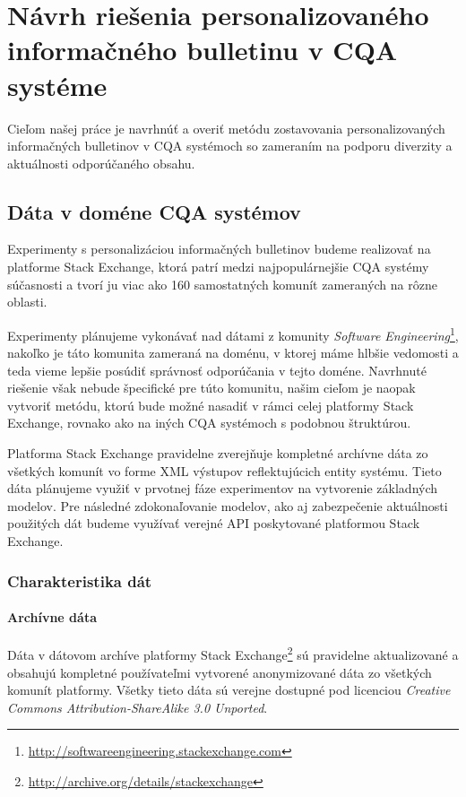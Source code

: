 \newpage
\chapter{Návrh riešenia personalizovaného informačného bulletinu v CQA systéme}

Cieľom našej práce je navrhnúť a overiť metódu zostavovania personalizovaných informačných bulletinov v CQA systémoch
so zameraním na podporu diverzity a aktuálnosti odporúčaného obsahu.

\section{Dáta v doméne CQA systémov}

Experimenty s personalizáciou informačných bulletinov budeme realizovať na platforme Stack Exchange, ktorá patrí medzi
najpopulárnejšie CQA systémy súčasnosti a tvorí ju viac ako 160 samostatných komunít zameraných na rôzne oblasti.

Experimenty plánujeme vykonávať nad dátami z komunity \textit{Software Engineering}\footnote{\url{http://softwareengineering.stackexchange.com}},
nakoľko je táto komunita zameraná na doménu, v ktorej máme hlbšie vedomosti a teda vieme lepšie posúdiť správnosť
odporúčania v tejto doméne. Navrhnuté riešenie však nebude špecifické pre túto komunitu, našim cieľom je naopak vytvoriť
metódu, ktorú bude možné nasadiť v rámci celej platformy Stack Exchange, rovnako ako na iných CQA systémoch s podobnou
štruktúrou.

Platforma Stack Exchange pravidelne zverejňuje kompletné archívne dáta zo všetkých komunít vo forme XML výstupov reflektujúcich
entity systému. Tieto dáta plánujeme využiť v prvotnej fáze experimentov na vytvorenie základných modelov.
Pre následné zdokonaľovanie modelov, ako aj zabezpečenie aktuálnosti použitých dát budeme využívať verejné API poskytované
platformou Stack Exchange.

\subsection{Charakteristika dát}

\subsubsection{Archívne dáta}
Dáta v dátovom archíve platformy Stack Exchange\footnote{\url{http://archive.org/details/stackexchange}} sú pravidelne
aktualizované a obsahujú kompletné používateľmi vytvorené anonymizované dáta zo všetkých komunít platformy.
Všetky tieto dáta sú verejne dostupné pod licenciou \emph{Creative Commons Attribution-ShareAlike 3.0 Unported}.

